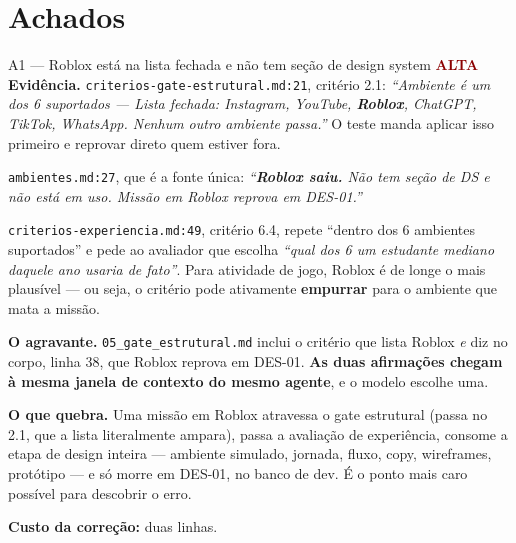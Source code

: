 \documentclass[11pt,a4paper]{article}
\newcommand{\sevalta}{\textcolor{DarkRed}{\textbf{ALTA}}}
\begin{document}
\section{Achados}

\begin{achadobox}{A1 --- Roblox est\'a na lista fechada e n\~ao tem se\c{c}\~ao de design system \hfill \sevalta}
\textbf{Evid\^encia.} \texttt{criterios-gate-estrutural.md:21}, crit\'erio 2.1: \emph{``Ambiente
\'e um dos 6 suportados --- Lista fechada: Instagram, YouTube, \textbf{Roblox}, ChatGPT, TikTok,
WhatsApp. Nenhum outro ambiente passa.''} O teste manda aplicar isso primeiro e reprovar direto
quem estiver fora.

\texttt{ambientes.md:27}, que \'e a fonte \'unica: \emph{``\textbf{Roblox saiu.} N\~ao tem
se\c{c}\~ao de DS e n\~ao est\'a em uso. Miss\~ao em Roblox reprova em DES-01.''}

\texttt{criterios-experiencia.md:49}, crit\'erio 6.4, repete ``dentro dos 6 ambientes
suportados'' e pede ao avaliador que escolha \emph{``qual dos 6 um estudante mediano daquele ano
usaria de fato''}. Para atividade de jogo, Roblox \'e de longe o mais plaus\'ivel --- ou seja, o
crit\'erio pode ativamente \textbf{empurrar} para o ambiente que mata a miss\~ao.

\textbf{O agravante.} \texttt{05\_gate\_estrutural.md} inclui o crit\'erio que lista Roblox
\emph{e} diz no corpo, linha 38, que Roblox reprova em DES-01. \textbf{As duas afirma\c{c}\~oes
chegam \`a mesma janela de contexto do mesmo agente}, e o modelo escolhe uma.

\textbf{O que quebra.} Uma miss\~ao em Roblox atravessa o gate estrutural (passa no 2.1, que a
lista literalmente ampara), passa a avalia\c{c}\~ao de experi\^encia, consome a etapa de design
inteira --- ambiente simulado, jornada, fluxo, copy, wireframes, prot\'otipo --- e s\'o morre em
DES-01, no banco de dev. \'E o ponto mais caro poss\'ivel para descobrir o erro.

\textbf{Custo da corre\c{c}\~ao:} duas linhas.
\end{achadobox}
\end{document}
